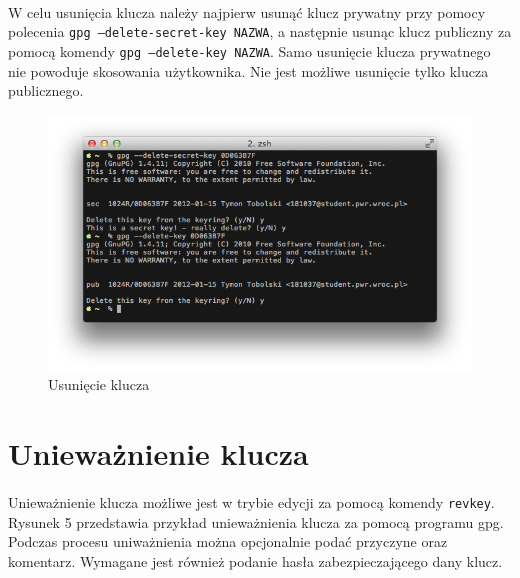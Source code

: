 \documentclass[wide,a4paper,titlepage,12pt] {article}
\begin{document}
  \newpage
  \paragraph{}
  \newpage

  \paragraph{}
  W celu usunięcia klucza należy najpierw usunąć klucz prywatny przy pomocy polecenia \texttt{gpg --delete-secret-key NAZWA}, a następnie usunąc klucz publiczny za pomocą komendy \texttt{gpg --delete-key NAZWA}. Samo usunięcie klucza prywatnego nie powoduje skosowania użytkownika. Nie jest możliwe usunięcie tylko klucza publicznego.


  \begin{figure}[h!]
    \begin{center}
      \includegraphics[width=\textwidth]{img/4.png}
      \caption{Usunięcie klucza}
    \end{center}
  \end{figure}

  \newpage

  \section{Unieważnienie klucza}
  \paragraph{}
  Unieważnienie klucza możliwe jest w trybie edycji za pomocą komendy \texttt{revkey}. Rysunek 5 przedstawia przykład unieważnienia klucza za pomocą programu gpg. Podczas procesu uniważnienia można opcjonalnie podać przyczyne oraz komentarz. Wymagane jest również podanie hasła zabezpieczającego dany klucz.
\end{document}
